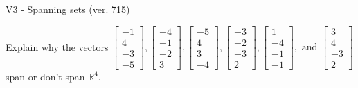 \begin{exercise}
  \begin{exerciseTitle}V3 - Spanning sets (ver. 715)\end{exerciseTitle}
  \begin{exerciseStatement}
    Explain why the vectors \(\left[\begin{array}{r}
-1 \\
4 \\
-3 \\
-5
\end{array}\right] , \left[\begin{array}{r}
-4 \\
-1 \\
-2 \\
3
\end{array}\right] , \left[\begin{array}{r}
-5 \\
4 \\
3 \\
-4
\end{array}\right] , \left[\begin{array}{r}
-3 \\
-2 \\
-3 \\
2
\end{array}\right] , \left[\begin{array}{r}
1 \\
-4 \\
-1 \\
-1
\end{array}\right] , \text{ and } \left[\begin{array}{r}
3 \\
4 \\
-3 \\
2
\end{array}\right]\) span or don't span \(\mathbb{R}^4\). 
	



\end{exerciseStatement}
\end{exercise}
